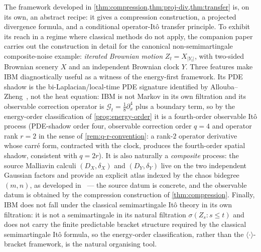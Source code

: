 \documentclass[11pt,reqno]{amsart}
\theoremstyle{plain}
\theoremstyle{definition}
\theoremstyle{remark}
\newcommand{\IBM}{Z}
\begin{document}
The framework developed in
\cref{thm:compression,thm:proj-div,thm:transfer} is, on its own, an
abstract recipe: it gives a compression construction, a projected
divergence formula, and a conditional operator-It\^o transfer
principle. To exhibit its reach in a regime where classical methods
do not apply, the companion paper~\cite{IBMPaper} carries out the
construction in detail for the canonical non-semimartingale
composite-noise example: \emph{iterated Brownian motion}
$\IBM_t=X_{|Y_t|}$, with two-sided Brownian scenery $X$ and an
independent Brownian clock $Y$. Three features make IBM diagnostically
useful as a witness of the energy-first framework. Its PDE shadow is
the bi-Laplacian/local-time PDE signature identified by
Allouba--Zheng~\cite{AllouZheng}, not the heat equation: IBM is not
Markov in its own filtration and its observable correction operator
is $\mathcal G_t=\tfrac18\partial_x^{4}$ plus a boundary term, so by
the energy-order classification of \cref{prog:energy-order} it is a
fourth-order observable It\^o process (PDE-shadow order four,
observable correction order $q=4$ and operator rank $r=2$ in the sense
of \cref{rem:q-r-convention}: a rank-$2$ operator derivative whose
carr\'e form, contracted with the clock, produces the fourth-order
spatial shadow, consistent with $q=2r$). It is also naturally a
\emph{composite} process: the source Malliavin calculi
$(D_X,\delta_X)$ and $(D_Y,\delta_Y)$ live on the two independent
Gaussian factors and provide an explicit atlas indexed by the chaos
bidegree $(m,n)$, as developed in~\cite{Fontes-IBMchaos} --- the
source datum is concrete, and the observable datum is obtained by the
compression construction of \cref{thm:compression}. Finally, IBM does
not fall under the classical semimartingale It\^o theory in its own
filtration: it is not a semimartingale in its natural filtration
$\sigma(\IBM_s:s\le t)$ and does not carry the finite predictable
bracket structure required by the classical semimartingale It\^o
formula, so the energy-order classification, rather than the
$\langle\cdot\rangle$-bracket framework, is the natural organising
tool.
\end{document}
